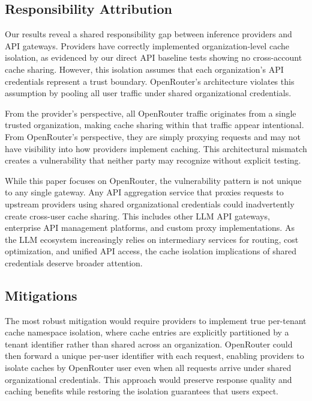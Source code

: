 \documentclass[conference]{IEEEtran}
\begin{document}
\subsection{Responsibility Attribution}

Our results reveal a shared responsibility gap between inference providers and API gateways.
Providers have correctly implemented organization-level cache isolation, as evidenced by our direct API baseline tests showing no cross-account cache sharing.
However, this isolation assumes that each organization's API credentials represent a trust boundary.
OpenRouter's architecture violates this assumption by pooling all user traffic under shared organizational credentials.

From the provider's perspective, all OpenRouter traffic originates from a single trusted organization, making cache sharing within that traffic appear intentional.
From OpenRouter's perspective, they are simply proxying requests and may not have visibility into how providers implement caching.
This architectural mismatch creates a vulnerability that neither party may recognize without explicit testing.

While this paper focuses on OpenRouter, the vulnerability pattern is not unique to any single gateway.
Any API aggregation service that proxies requests to upstream providers using shared organizational credentials could inadvertently create cross-user cache sharing.
This includes other LLM API gateways, enterprise API management platforms, and custom proxy implementations.
As the LLM ecosystem increasingly relies on intermediary services for routing, cost optimization, and unified API access, the cache isolation implications of shared credentials deserve broader attention.

\subsection{Mitigations}

The most robust mitigation would require providers to implement true per-tenant cache namespace isolation, where cache entries are explicitly partitioned by a tenant identifier rather than shared across an organization.
OpenRouter could then forward a unique per-user identifier with each request, enabling providers to isolate caches by OpenRouter user even when all requests arrive under shared organizational credentials.
This approach would preserve response quality and caching benefits while restoring the isolation guarantees that users expect.
\end{document}
